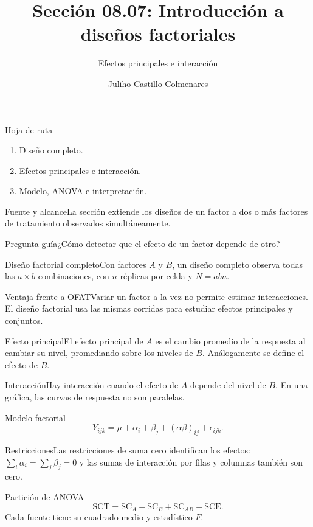 \documentclass[10pt,aspectratio=169]{beamer}
\title[Diseños factoriales]{Sección 08.07: Introducción a diseños factoriales}\subtitle{Efectos principales e interacción}\author[J. Castillo Colmenares]{Juliho Castillo Colmenares}\institute{Tecnológico de Monterrey}\date{}
\begin{document}
\begin{frame}[plain]\titlepage\end{frame}
\begin{frame}{Hoja de ruta}\small\begin{enumerate}\item Diseño completo.\item Efectos principales e interacción.\item Modelo, ANOVA e interpretación.\end{enumerate}\end{frame}
\begin{frame}{Fuente y alcance}\small La sección extiende los diseños de un factor a dos o más factores de tratamiento observados simultáneamente.\begin{block}{Pregunta guía}¿Cómo detectar que el efecto de un factor depende de otro?\end{block}\end{frame}
\begin{frame}{Diseño factorial completo}\small Con factores $A$ y $B$, un diseño completo observa todas las $a\times b$ combinaciones, con $n$ réplicas por celda y $N=abn$.\end{frame}
\begin{frame}{Ventaja frente a OFAT}\small Variar un factor a la vez no permite estimar interacciones. El diseño factorial usa las mismas corridas para estudiar efectos principales y conjuntos.\end{frame}
\begin{frame}{Efecto principal}\small El efecto principal de $A$ es el cambio promedio de la respuesta al cambiar su nivel, promediando sobre los niveles de $B$. Análogamente se define el efecto de $B$.\end{frame}
\begin{frame}{Interacción}\small Hay interacción cuando el efecto de $A$ depende del nivel de $B$. En una gráfica, las curvas de respuesta no son paralelas.\end{frame}
\begin{frame}{Modelo factorial}\small\[Y_{ijk}=\mu+\alpha_i+\beta_j+(\alpha\beta)_{ij}+\epsilon_{ijk}.\]\end{frame}
\begin{frame}{Restricciones}\small Las restricciones de suma cero identifican los efectos: $\sum_i\alpha_i=\sum_j\beta_j=0$ y las sumas de interacción por filas y columnas también son cero.\end{frame}
\begin{frame}{Partición de ANOVA}\small\[\mathrm{SCT}=\mathrm{SC}_A+\mathrm{SC}_B+\mathrm{SC}_{AB}+\mathrm{SCE}.\]Cada fuente tiene su cuadrado medio y estadístico $F$.\end{frame}
\end{document}
